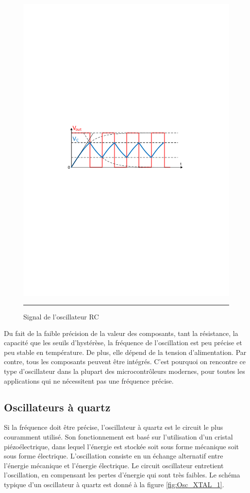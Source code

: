 \begin{figure}[htb]
  \centering
  \includegraphics [angle=0, width=14cm]{./Figures/Chap6_Horloges/Osc_RC_2.pdf}
  \rule{35em}{0.5pt}
  \caption{Signal de l'oscillateur RC}
  \label{fig:Osc_RC_2}
\end{figure}

Du fait de la faible précision de la valeur des composants, tant la résistance, la capacité que les seuils d'hystérèse, la fréquence de l'oscillation est peu précise et peu stable en température. De plus, elle dépend de la tension d'alimentation. Par contre, tous les composants peuvent être intégrés. C'est pourquoi on rencontre ce type d'oscillateur dans la plupart des microcontrôleurs modernes, pour toutes les applications qui ne nécessitent pas une fréquence précise.

\subsection{Oscillateurs à quartz}
Si la fréquence doit être précise, l'oscillateur à quartz est le circuit le plus couramment utilisé. Son fonctionnement est basé sur l'utilisation d'un cristal piézoélectrique, dans lequel l'énergie est stockée soit sous forme mécanique soit sous forme électrique. L'oscillation consiste en un échange alternatif entre l'énergie mécanique et l'énergie électrique. Le circuit oscillateur entretient l'oscillation, en compensant les pertes d'énergie qui sont très faibles. Le schéma typique d'un oscillateur à quartz est donné à la figure \ref{fig:Osc_XTAL_1}.

